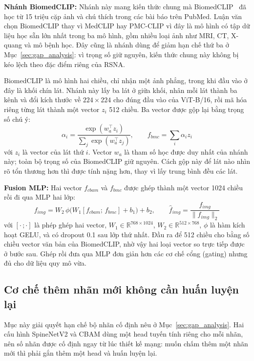 \textbf{Nhánh BiomedCLIP:} Nhánh này mang kiến thức chung mà BiomedCLIP~\cite{zhang2024biomedclip} đã học từ 15 triệu cặp ảnh và chú thích trong các bài báo trên PubMed. Luận văn chọn BiomedCLIP thay vì MedCLIP hay PMC-CLIP vì đây là mô hình có tập dữ liệu học sẵn lớn nhất trong ba mô hình, gồm nhiều loại ảnh như MRI, CT, X-quang và mô bệnh học. Đây cũng là nhánh dùng để giảm hạn chế thứ ba ở Mục~\ref{sec:gap_analysis}: vì trọng số giữ nguyên, kiến thức chung này không bị kéo lệch theo đặc điểm riêng của RSNA.

BiomedCLIP là mô hình hai chiều, chỉ nhận một ảnh phẳng, trong khi đầu vào ở đây là khối chín lát. Nhánh này lấy ba lát ở giữa khối, nhân mỗi lát thành ba kênh và đổi kích thước về $224 \times 224$ cho đúng đầu vào của ViT-B/16, rồi mã hóa riêng từng lát thành một vector $z_i$ 512 chiều. Ba vector được gộp lại bằng trọng số chú ý:
\begin{equation}
    \alpha_i = \frac{\exp(w_a^\top z_i)}{\sum_{j} \exp(w_a^\top z_j)}, \qquad
    f_{bmc} = \sum_{i} \alpha_i z_i
    \label{eq:slice_pool}
\end{equation}
với $z_i$ là vector của lát thứ $i$. Vector $w_a$ là tham số học được duy nhất của nhánh này; toàn bộ trọng số của BiomedCLIP giữ nguyên. Cách gộp này để lát nào nhìn rõ tổn thương hơn thì được tính nặng hơn, thay vì lấy trung bình đều các lát.

\textbf{Fusion MLP:} Hai vector $f_{cbam}$ và $f_{bmc}$ được ghép thành một vector 1024 chiều rồi đi qua MLP hai lớp:
\begin{equation}
    f_{img} = W_2\,\phi\big(W_1 [f_{cbam};\, f_{bmc}] + b_1\big) + b_2, \qquad
    \hat{f}_{img} = \frac{f_{img}}{\|f_{img}\|_2}
    \label{eq:fusion}
\end{equation}
với $[\cdot\,;\cdot]$ là phép ghép hai vector, $W_1 \in \mathbb{R}^{768 \times 1024}$, $W_2 \in \mathbb{R}^{512 \times 768}$, $\phi$ là hàm kích hoạt GELU, và có dropout 0.1 sau lớp thứ nhất. Đầu ra để 512 chiều cho bằng số chiều vector văn bản của BiomedCLIP, nhờ vậy hai loại vector so trực tiếp được ở bước sau. Ghép rồi đưa qua MLP đơn giản hơn các cơ chế cổng (gating) nhưng đủ cho dữ liệu quy mô vừa.

\subsection{Cơ chế thêm nhãn mới không cần huấn luyện lại}
\label{subsec:cosine_head}

Mục này giải quyết hạn chế bộ nhãn cố định nêu ở Mục~\ref{sec:gap_analysis}. Hai cấu hình SpineNetV2 và CBAM dùng một head tuyến tính riêng cho mỗi nhãn, nên số nhãn được cố định ngay từ lúc thiết kế mạng: muốn chấm thêm một nhãn mới thì phải gắn thêm một head và huấn luyện lại.

